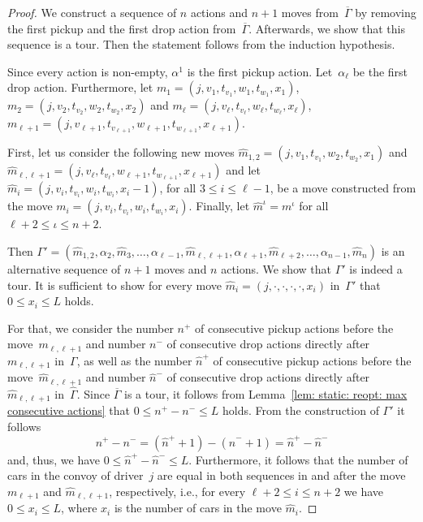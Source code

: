 \documentclass[english]{llncs}
\numberwithin{sublemma}{lemma}
\newcommand{\ntourd}{\ensuremath{n}}
\newcommand{\capd}{\ensuremath{L}}
\newcommand{\tourd}{\ensuremath{\Gamma}}
\newcommand{\action}{\ensuremath{\alpha}}
\newcommand{\move}{\ensuremath{m}}
\begin{document}
\begin{proof}
We construct a sequence of $\ntourd$ actions and $\ntourd + 1$ moves from~$\overline{\tourd}$ by removing the first pickup and the first drop action from~$\overline{\tourd}$.
Afterwards, we show that this sequence is a tour.
Then the statement follows from the induction hypothesis.

Since every action is non-empty, $\action^1$ is the first pickup action.
Let~$\action_\ell$ be the first drop action.
Furthermore, let $\move_1 = (j, v_1, t_{v_1}, w_1, t_{w_1}, x_1)$, $\move_2 = (j, v_2, t_{v_2}, w_2, t_{w_2}, x_2)$
and $\move_\ell = (j, v_\ell, t_{v_\ell}, w_\ell, t_{w_\ell}, x_\ell)$, $\move_{\ell + 1} = (j, v_{\ell + 1}, t_{v_{\ell + 1}}, w_{\ell + 1}, t_{w_{\ell + 1}}, x_{\ell + 1})$.

First, let us consider the following new moves $\hat{\move}_{1,2} = (j, v_1, t_{v_1}, w_2, t_{w_2}, x_1)$ and 
$\hat{\move}_{\ell, \ell+1} = (j, v_\ell, t_{v_\ell}, w_{\ell + 1}, t_{w_{\ell + 1}}, x_{\ell + 1})$ and
let $\hat{\move}_i = (j, v_i, t_{v_i}, w_i, t_{w_i}, x_i - 1)$, for all $3 \leq i \leq \ell - 1$, be a move constructed from the move $\move_i = (j, v_i, t_{v_i}, w_i, t_{w_i}, x_i)$.
Finally, let $\hat{\move}^\iota = \move^\iota$ for all $\ell + 2 \leq \iota \leq \ntourd + 2$.

Then $\tourd' = (\hat{\move}_{1,2}, \action_2, \hat{\move}_3, \dotsc, \action_{\ell - 1}, \hat{\move}_{\ell, \ell + 1}, \action_{\ell+1}, \hat{\move}_{\ell+2}, \dotsc, \action_{\ntourd - 1}, \hat{\move}_{\ntourd})$
is an alternative sequence of $\ntourd + 1$ moves and $\ntourd$ actions.
We show that $\tourd'$ is indeed a tour.
It is sufficient to show for every move $\hat{\move}_i = (j, \cdot, \cdot, \cdot, \cdot, x_i)$ in~$\tourd'$ that $0 \leq x_i \leq \capd$ holds.

For that, we consider the number ${n}^+$ of consecutive pickup actions before the move~${\move}_{\ell, \ell+1}$ and 
number ${n}^-$ of consecutive drop actions directly after~${\move}_{\ell, \ell+1}$ in~$\tourd$,
as well as
the number $\hat{n}^+$ of consecutive pickup actions before the move~$\hat{\move}_{\ell, \ell+1}$ and 
number $\hat{n}^-$ of consecutive drop actions directly after~$\hat{\move}_{\ell, \ell+1}$ in~$\hat{\tourd}$.
Since $\overline{\tourd}$ is a tour, it follows from Lemma~\ref{lem: static: reopt: max consecutive actions} that $0 \leq n^+ - n^- \leq \capd$ holds.
From the construction of $\tourd'$ it follows
\[
  n^+ - n^- = (\hat{n}^+ + 1) - (\hat{n}^- + 1) = \hat{n}^+ - \hat{n}^-
\]
and, thus, we have $0 \leq \hat{n}^+ - \hat{n}^- \leq \capd$.
Furthermore, it follows that the number of cars in the convoy of driver~$j$ are equal in both sequences in and after the move~$\move_{\ell + 1}$ and $\hat{\move}_{\ell,\ell + 1}$, respectively,
i.e., for every $\ell + 2 \leq i \leq \ntourd + 2$ we have $0 \leq x_i \leq \capd$, where $x_i$ is the number of cars in the move $\hat{\move}_i$.



\end{proof}
\end{document}
